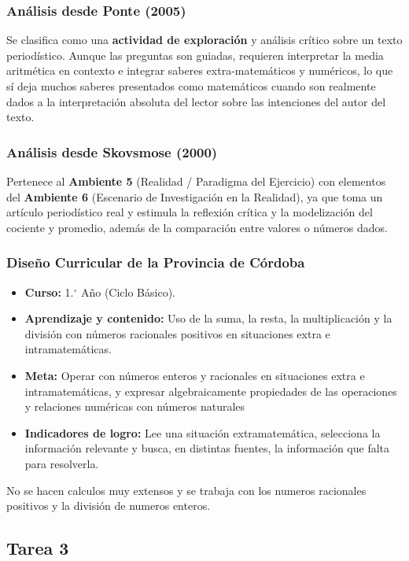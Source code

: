 \documentclass[11pt,a4paper]{article}
\begin{document}
\subsubsection{Análisis desde Ponte (2005)}
Se clasifica como una \textbf{actividad de exploración} y análisis crítico sobre un texto periodístico. Aunque las preguntas son guiadas, requieren interpretar la media aritmética en contexto e integrar saberes extra-matemáticos y numéricos, lo que sí deja muchos saberes presentados como matemáticos cuando son realmente dados a la interpretación absoluta del lector sobre las intenciones del autor del texto.

\subsubsection{Análisis desde Skovsmose (2000)}
Pertenece al \textbf{Ambiente 5} (Realidad / Paradigma del Ejercicio) con elementos del \textbf{Ambiente 6} (Escenario de Investigación en la Realidad), ya que toma un artículo periodístico real y estimula la reflexión crítica y la modelización del cociente y promedio, además de la comparación entre valores o números dados.

\subsubsection{Diseño Curricular de la Provincia de Córdoba}
\begin{itemize}
    \item \textbf{Curso:} 1.$^{\circ}$ Año (Ciclo Básico).
    \item \textbf{Aprendizaje y contenido:} Uso de la suma, la resta, la multiplicación y la división con números racionales positivos en situaciones extra e intramatemáticas.
    \item \textbf{Meta:} Operar con números enteros y racionales en situaciones extra e intramatemáticas, y expresar algebraicamente propiedades de las operaciones y relaciones numéricas con números naturales
    \item \textbf{Indicadores de logro:} Lee una situación extramatemática, selecciona la información relevante y busca, en distintas fuentes, la información que falta para resolverla.
\end{itemize}
No se hacen calculos muy extensos y se trabaja con los numeros racionales positivos y la división de numeros enteros.
\subsection{Tarea 3}
\end{document}
